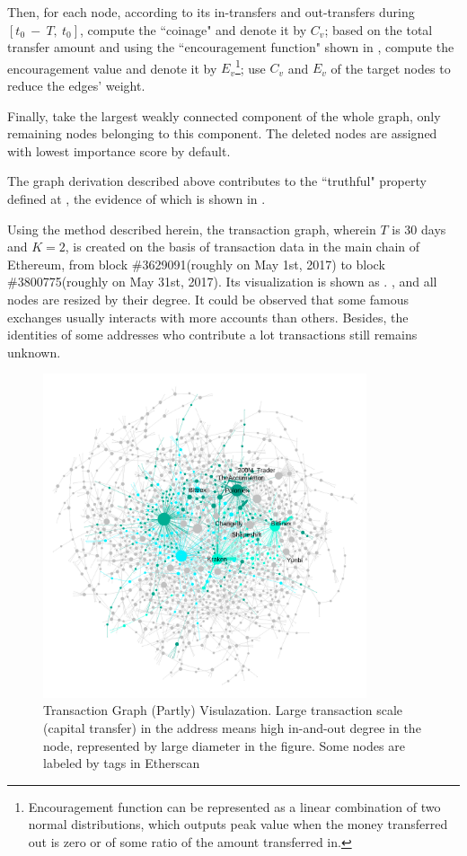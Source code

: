 Then, for each node, according to its in-transfers and out-transfers during $[t_0\ −\ T,\ t_0]$, compute the ``coinage" and denote it by $C_v$; based on the total transfer amount and using the ``encouragement function" shown in , compute the encouragement value and denote it by $E_v$\footnote{Encouragement function can be represented as a linear combination of two normal distributions, which outputs peak value when the money transferred out is zero or of some ratio of the amount transferred in.}; use $C_v$ and $E_v$ of the target nodes to reduce the edges' weight.

Finally, take the largest weakly connected component of the whole graph, only remaining nodes belonging to this component. The deleted nodes are assigned with lowest importance score by default.

The graph derivation described above contributes to the ``truthful" property defined at , the evidence of which is shown in .

Using the method described herein, the transaction graph, wherein $T$ is 30 days and $K=2$, is created on the basis of transaction data in the main chain of Ethereum, from block \#3629091(roughly on May 1st, 2017) to block \#3800775(roughly on May 31st, 2017). Its visualization is shown as . , and all nodes are resized by their degree. It could be observed that some famous exchanges usually interacts with more accounts than others. Besides, the identities of some addresses who contribute a lot transactions still remains unknown. 

\begin{figure}[htbp]
	\centering
	\includegraphics[width=0.85\textwidth]{figs/wgc1.png}
	\caption{Transaction Graph (Partly) Visulazation. \small{Large transaction scale (capital transfer) in the address means high in-and-out degree in the node, represented by large diameter in the figure. Some nodes are labeled by tags in Etherscan\cite{etherscan}}  }\label{fig:wgc}
\end{figure}

